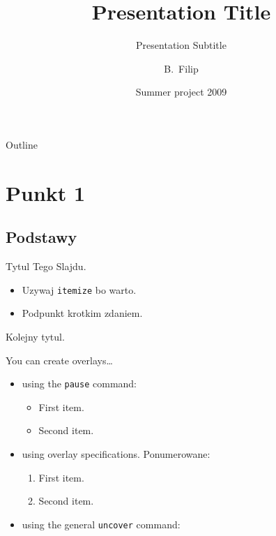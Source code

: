 \documentclass{beamer}
\title[Short Paper Title] %
{Presentation Title}
\subtitle
{Presentation Subtitle} %
\author[Basia Filip] %
{B.~Filip}
\institute[AGH] %
{
  Faculty of Physics and Applied Computer Science\\
  AGH
}
\date[2009] %
{Summer project 2009}
\begin{document}
\begin{frame}
  \titlepage
\end{frame}

\begin{frame}{Outline}
  \tableofcontents
\end{frame}

\section{Punkt 1}

\subsection{Podstawy}

\begin{frame}{Tytul Tego Slajdu.}

  \begin{itemize}
  \item
    Uzywaj \texttt{itemize} bo warto.
  \item
    Podpunkt krotkim zdaniem.
  \end{itemize}
\end{frame}

\begin{frame}{Kolejny tytul.}

  You can create overlays\dots
  \begin{itemize}
  \item using the \texttt{pause} command:
    \begin{itemize}
    \item
      First item.
      \pause
    \item    
      Second item.
    \end{itemize}
  \item
    using overlay specifications. \alert{Ponumerowane}:
    \begin{enumerate}
    \item<3->
      First item.
    \item<4->
      Second item.
    \end{enumerate}
  \item
    using the general \texttt{uncover} command:
    \begin{itemize}
    \end{itemize}
  \end{itemize}
\end{frame}
\end{document}
